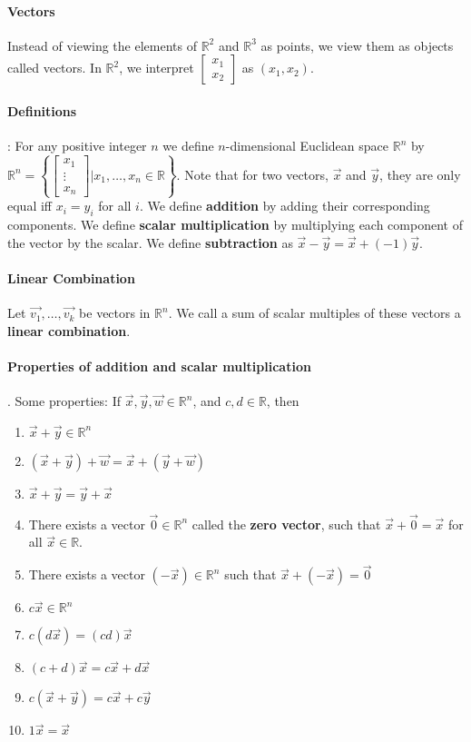 \documentclass[10pt,letter]{article}
\begin{document}
\paragraph{Vectors} Instead of viewing the elements of $\mathbb{R}^2$ and $\mathbb{R}^3$ as points, we view them as objects called vectors. In $\mathbb{R}^2$, we interpret $\begin{bmatrix}x_1 \\ x_2\end{bmatrix}$ as $(x_1,x_2)$.
\paragraph{Definitions}: For any positive integer $n$ we define $n$-dimensional Euclidean space $\mathbb{R}^n$ by $\mathbb{R}^n = \left\{\begin{bmatrix}x_1\\\vdots\\x_n\end{bmatrix} | x_1,\ldots, x_n\in\mathbb{R}\right\}$. Note that for two vectors, $\vec{x}$ and $\vec{y}$, they are only equal iff $x_i=y_i$ for all $i$. We define \textbf{addition} by adding their corresponding components. We define \textbf{scalar multiplication} by multiplying each component of the vector by the scalar. We define \textbf{subtraction} as $\vec{x}-\vec{y}=\vec{x}+(-1)\vec{y}$. 
\paragraph{Linear Combination} Let $\vec{v_1},\ldots,\vec{v_k}$ be vectors in $\mathbb{R}^n$. We call a sum of scalar multiples of these vectors a \textbf{linear combination}. 

\paragraph{Properties of addition and scalar multiplication}. Some properties: If $\vec{x},\vec{y},\vec{w}\in\mathbb{R}^n$, and $c,d\in\mathbb{R}$, then \begin{enumerate}
    \item $\vec{x}+\vec{y}\in\mathbb{R}^n$ 
    \item $(\vec{x}+\vec{y})+\vec{w}=\vec{x}+(\vec{y}+\vec{w})$ 
    \item $\vec{x}+\vec{y}=\vec{y}+\vec{x}$ 
    \item There exists a vector $\vec{0}\in\mathbb{R}^n$ called the \textbf{zero vector}, such that $\vec{x}+\vec{0}=\vec{x}$ for all $\vec{x}\in\mathbb{R}$. 
    \item There exists a vector $(-\vec{x})\in\mathbb{R}^n$ such that $\vec{x}+(-\vec{x})=\vec{0}$ 
    \item $c\vec{x}\in\mathbb{R}^n$ 
    \item $c(d\vec{x})=(cd)\vec{x}$ 
    \item $(c+d)\vec{x}=c\vec{x}+d\vec{x}$ 
    \item $c(\vec{x}+\vec{y})=c\vec{x}+c\vec{y}$
    \item $1\vec{x}=\vec{x}$
\end{enumerate} 
\end{document}
